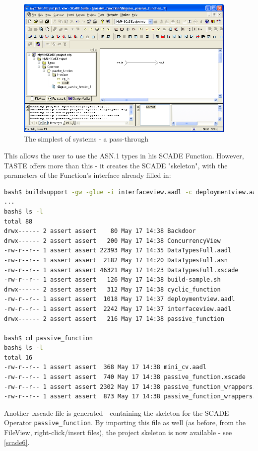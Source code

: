 \documentclass[11pt]{book}
\begin{document}
\begin{figure}
\centering
\includegraphics[width=0.95\textwidth]{imgs/scade9}
\caption{The simplest of systems - a pass-through}
\label{scade9}
\end{figure}

This allows the user to use the ASN.1 types in his SCADE Function. However, TASTE offers more than this -
it creates the SCADE "skeleton", with the parameters of the Function's interface already filled in:

\begin{lstlisting}[language=bash]
bash$ buildsupport -gw -glue -i interfaceview.aadl -c deploymentview.aadl -d DataTypesFull.aadl
...
bash$ ls -l
total 88
drwx------ 2 assert assert    80 May 17 14:38 Backdoor
drwx------ 2 assert assert   200 May 17 14:38 ConcurrencyView
-rw-r--r-- 1 assert assert 22393 May 17 14:35 DataTypesFull.aadl
-rw-r--r-- 1 assert assert  2182 May 17 14:20 DataTypesFull.asn
-rw-r--r-- 1 assert assert 46321 May 17 14:23 DataTypesFull.xscade
-rw-r--r-- 1 assert assert   126 May 17 14:38 build-sample.sh
drwx------ 2 assert assert   312 May 17 14:38 cyclic_function
-rw-r--r-- 1 assert assert  1018 May 17 14:37 deploymentview.aadl
-rw-r--r-- 1 assert assert  2242 May 17 14:37 interfaceview.aadl
drwx------ 2 assert assert   216 May 17 14:38 passive_function

bash$ cd passive_function
bash$ ls -l
total 16
-rw-r--r-- 1 assert assert  368 May 17 14:38 mini_cv.aadl
-rw-r--r-- 1 assert assert  740 May 17 14:38 passive_function.xscade
-rw-r--r-- 1 assert assert 2302 May 17 14:38 passive_function_wrappers.adb
-rw-r--r-- 1 assert assert  873 May 17 14:38 passive_function_wrappers.ads
\end{lstlisting}

Another .xscade file is generated - containing the skeleton for the SCADE Operator {\tt passive\_function}. 
By importing this file as well (as before, from the FileView, right-click/insert files), the project skeleton
is now available - see \ref{scade6}.
\end{document}

